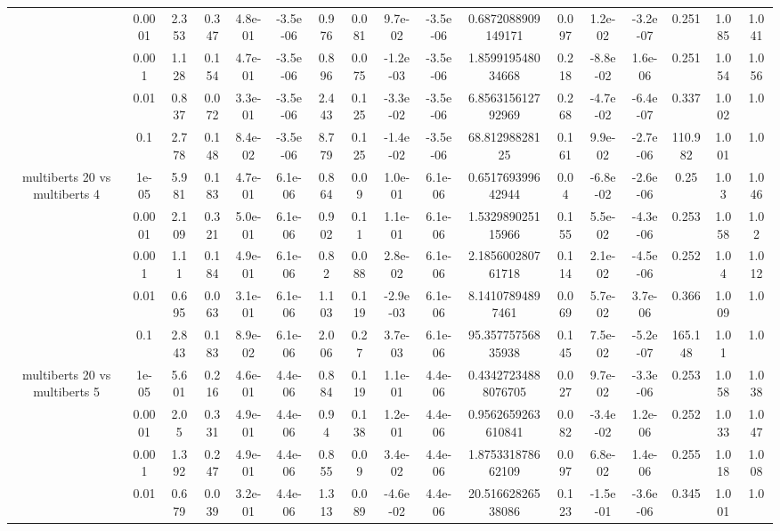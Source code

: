 \begin{tabular}{|c|c|c|c|c|c|c|c|c|c|c|c|c|c|c|c|c|}
 & 0.0001 & 2.353 & 0.347 & 4.8e-01 & -3.5e-06 & 0.976 & 0.081 & 9.7e-02 & -3.5e-06 & 0.6872088909149171 & 0.097 & 1.2e-02 & -3.2e-07 & 0.251 & 1.085 & 1.041 \\
 & 0.001 & 1.128 & 0.154 & 4.7e-01 & -3.5e-06 & 0.896 & 0.075 & -1.2e-03 & -3.5e-06 & 1.859919548034668 & 0.218 & -8.8e-02 & 1.6e-06 & 0.251 & 1.054 & 1.056 \\
 & 0.01 & 0.837 & 0.072 & 3.3e-01 & -3.5e-06 & 2.443 & 0.125 & -3.3e-02 & -3.5e-06 & 6.856315612792969 & 0.268 & -4.7e-02 & -6.4e-07 & 0.337 & 1.002 & 1.0 \\
 & 0.1 & 2.778 & 0.148 & 8.4e-02 & -3.5e-06 & 8.779 & 0.125 & -1.4e-02 & -3.5e-06 & 68.81298828125 & 0.161 & 9.9e-02 & -2.7e-06 & 110.982 & 1.001 & 1.0 \\
\hline
\multirow{5}{*}{multiberts 20 vs multiberts 4} & 1e-05 & 5.981 & 0.183 & 4.7e-01 & 6.1e-06 & 0.864 & 0.09 & 1.0e-01 & 6.1e-06 & 0.651769399642944 & 0.04 & -6.8e-02 & -2.6e-06 & 0.25 & 1.03 & 1.046 \\
 & 0.0001 & 2.109 & 0.321 & 5.0e-01 & 6.1e-06 & 0.902 & 0.11 & 1.1e-01 & 6.1e-06 & 1.532989025115966 & 0.155 & 5.5e-02 & -4.3e-06 & 0.253 & 1.058 & 1.02 \\
 & 0.001 & 1.11 & 0.184 & 4.9e-01 & 6.1e-06 & 0.82 & 0.088 & 2.8e-02 & 6.1e-06 & 2.185600280761718 & 0.114 & 2.1e-02 & -4.5e-06 & 0.252 & 1.04 & 1.012 \\
 & 0.01 & 0.695 & 0.063 & 3.1e-01 & 6.1e-06 & 1.103 & 0.119 & -2.9e-03 & 6.1e-06 & 8.14107894897461 & 0.069 & 5.7e-02 & 3.7e-06 & 0.366 & 1.009 & 1.0 \\
 & 0.1 & 2.843 & 0.183 & 8.9e-02 & 6.1e-06 & 2.006 & 0.27 & 3.7e-03 & 6.1e-06 & 95.35775756835938 & 0.145 & 7.5e-02 & -5.2e-07 & 165.148 & 1.01 & 1.0 \\
\hline
\multirow{5}{*}{multiberts 20 vs multiberts 5} & 1e-05 & 5.601 & 0.216 & 4.6e-01 & 4.4e-06 & 0.884 & 0.119 & 1.1e-01 & 4.4e-06 & 0.43427234888076705 & 0.027 & 9.7e-02 & -3.3e-06 & 0.253 & 1.058 & 1.038 \\
 & 0.0001 & 2.05 & 0.331 & 4.9e-01 & 4.4e-06 & 0.94 & 0.138 & 1.2e-01 & 4.4e-06 & 0.9562659263610841 & 0.082 & -3.4e-02 & 1.2e-06 & 0.252 & 1.033 & 1.047 \\
 & 0.001 & 1.392 & 0.247 & 4.9e-01 & 4.4e-06 & 0.855 & 0.09 & 3.4e-02 & 4.4e-06 & 1.875331878662109 & 0.097 & 6.8e-02 & 1.4e-06 & 0.255 & 1.018 & 1.008 \\
 & 0.01 & 0.679 & 0.039 & 3.2e-01 & 4.4e-06 & 1.313 & 0.089 & -4.6e-02 & 4.4e-06 & 20.51662826538086 & 0.123 & -1.5e-01 & -3.6e-06 & 0.345 & 1.001 & 1.0 \\

\end{tabular}
